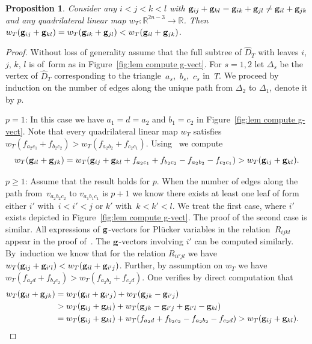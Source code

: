 \documentclass[pdftex]{sigma}%
\newtheorem{Proposition}[Theorem]{Proposition}
\numberwithin{equation}{section}
\begin{document}
\begin{Proposition}
Consider any $i<j<k<l$ with ${\bf g}_{ij}+{\bf g}_{kl}={\bf g}_{ik}+{\bf g}_{jl}\not = {\bf g}_{il}+{\bf g}_{jk}$ and any quadrilateral linear map $w_T\colon \mathbb R^{2n-3}\to \mathbb R$. Then $w_T({\bf g}_{ij}+{\bf g}_{kl})=w_T({\bf g}_{ik}+{\bf g}_{jl}) < w_T({\bf g}_{il}+{\bf g}_{jk})$.
\end{Proposition}

\begin{proof}
Without loss of generality assume that the full subtree of $\widehat D_T$ with leaves $i$, $j$, $k$, $l$ is of~form as in Figure~\ref{fig:lem compute g-vect}.
For $s=1,2$ let $\Delta_s$ be the vertex of $\widehat D_T$ corresponding to the tri\-angle~$a_s$,~$b_s$,~$c_s$ in~$T$.
We proceed by induction on the number of edges along the unique path from $\Delta_2$ to $\Delta_1$, denote it by $p$.

\medskip \noindent
$p=1$: In this case we have $a_1=d=a_2$ and $b_1={c_2}$ in Figure~\ref{fig:lem compute g-vect}.
 Note that every quadrilateral linear map $w_T$ satisfies $w_T({f}_{a_2c_1}+{f}_{b_2c_2})>w_T({f}_{a_2b_2}+{f}_{c_2c_1})$.
 Using~ we compute
 \begin{displaymath}
 w_T({\bf g}_{il}+{\bf g}_{jk})=w_T({\bf g}_{ij}+{\bf g}_{kl} + f_{a_2c_1}+f_{b_2c_2} - f_{a_2b_2}-f_{c_2c_1}) > w_T({\bf g}_{ij}+{\bf g}_{kl}).
 \end{displaymath}

\medskip \noindent
$p\ge 1$: Assume that the result holds for $p$. When the number of edges along the path from~$v_{a_2b_2c_2}$ to $v_{a_1b_1c_1}$ is $p+1$ we know there exists at least one leaf of form either $i'$ with~$i<i'<j$ or $k'$ with~$k<k'<l$.
 We treat the first case, where $i'$ exists depicted in Figure~\ref{fig:lem compute g-vect}.
 The proof of the second case is similar.
 All expressions of ${\bf g}$-vectors for Pl\"ucker variables in the relation~$R_{ijkl}$ appear in the proof of~.
 The ${\bf g}$-vectors involving $i'$ can be computed similarly.
 By~induction we know that for the relation $R_{ii'jl}$ we have $w_T({\bf g}_{ij}+{\bf g}_{i'l})<w_T({\bf g}_{il}+{\bf g}_{i'j})$.
 Further, by assumption on $w_T$ we have $w_T({f}_{a_2d}+{f}_{b_2c_2})>w_T({f}_{a_2b_2}+{f}_{c_2d})$.
 One verifies by direct computation that
 \begin{align*}
 w_T({\bf g}_{il}+{\bf g}_{jk}) &= w_T({\bf g}_{il}+{\bf g}_{i'j}) + w_T({\bf g}_{jk}-{\bf g}_{i'j}) \\
 &> w_T({\bf g}_{ij}+{\bf g}_{kl}) + w_T({\bf g}_{jk}-{\bf g}_{i'j}+{\bf g}_{i'l} - {\bf g}_{kl})\\
 &= w_T({\bf g}_{ij}+{\bf g}_{kl}) + w_T({f}_{a_2d}+{f}_{b_2c_2}-{f}_{a_2b_2}-{f}_{c_2d}) > w_T({\bf g}_{ij}+{\bf g}_{kl}).\!\!\!\!\!\! \tag*{\qed}
\end{align*}
\renewcommand{\qed}{}
\end{proof}
\end{document}

